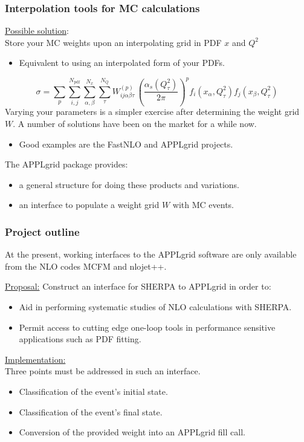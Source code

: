 \documentclass[10pt]{beamer}
\newcommand{\vso}{\vskip15pt}
\begin{document}
\begin{frame}
\frametitle{Interpolation tools for MC calculations}
\underline{Possible solution}: \\
Store your MC weights upon an interpolating grid in PDF $x$ and $Q^2$ \\
\begin{itemize}
\item<1-> Equivalent to using an interpolated form of your PDFs.
\end{itemize}

\begin{equation} \nonumber
\label{eq:applconv}
\sigma = \sum_p \sum_{i,j}^{N_{\mathrm{pdf}}} \sum_{\alpha,\beta}^{N_x} \sum_{\tau}^{N_{Q}}
W_{ij\alpha\beta\tau}^{(p)} \, \left( \frac{\alpha_s\left(Q^2_{\tau}\right)}{2\pi}\right)^{p}
f_{i}\left(x_{\alpha},  Q^2_{\tau}\right)f_{j}\left(x_{\beta},  Q^2_{\tau}\right)
\end{equation}
\vskip5pt
Varying your parameters is a simpler exercise after determining the weight grid $W$.
\vso
A number of solutions have been on the market for a while now. \\
\begin{itemize}
\item<1-> Good examples are the FastNLO and APPLgrid projects.
\end{itemize}
\vskip5pt
The APPLgrid package provides:
\begin{itemize}
\item<1->  a general structure for doing these products and variations.
\item<1->  an interface to populate a weight grid $W$ with MC events.
\end{itemize}
\end{frame}


\begin{frame}
\frametitle{Project outline}
At the present, working interfaces to the APPLgrid software are only available from the NLO codes MCFM and nlojet++.
\vso

\underline{Proposal:} 
\vskip4pt
Construct an interface for SHERPA to APPLgrid in order to:
\begin{itemize}
\item<1-> Aid in performing systematic studies of NLO calculations with SHERPA.
\item<1-> Permit access to cutting edge one-loop tools in performance sensitive applications such as PDF fitting.
 \end{itemize}
 
 \vskip15pt
\underline{Implementation:}\\
\vskip4pt
Three points must be addressed in such an interface.
\begin{itemize}
\item<1-> Classification of the event's initial state.
\item<1-> Classification of the event's final state.
\item<1-> Conversion of the provided weight into an APPLgrid fill call.

\end{itemize}

\end{frame}
\end{document}
